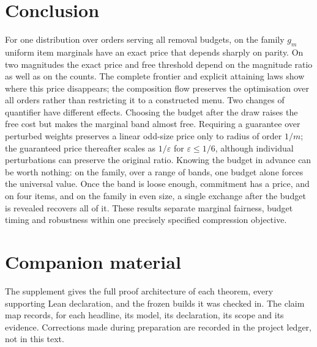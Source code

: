 \section{Conclusion}

For one distribution over orders serving all removal budgets, on the family $g_m$ uniform item
marginals have an exact price that depends sharply on parity. On two magnitudes the exact price
and free threshold depend on the magnitude ratio as well as on the counts. The complete frontier and explicit attaining
laws show where this price disappears; the composition flow preserves the optimisation over
all orders rather than restricting it to a constructed menu. Two changes of quantifier have
different effects. Choosing the budget after the draw raises the free cost but makes the
marginal band almost free. Requiring a guarantee over perturbed weights preserves a linear
odd-size price only to radius of order $1/m$; the guaranteed price thereafter scales as
$1/\varepsilon$ for $\varepsilon\le1/6$, although individual perturbations can preserve the original ratio.
Knowing the budget in advance can be worth nothing: on the family, over a range of bands, one
budget alone forces the universal value. Once the band is loose enough, commitment has a price,
and on four items, and on the family in even size, a single exchange after the budget is
revealed recovers all of it.
These results separate marginal fairness, budget timing and robustness within one precisely
specified compression objective.

\section*{Companion material}
The supplement gives the full proof architecture of each theorem, every supporting Lean
declaration, and the frozen builds it was checked in. The claim map records, for each
headline, its model, its declaration, its scope and its evidence. Corrections made during
preparation are recorded in the project ledger, not in this text.

